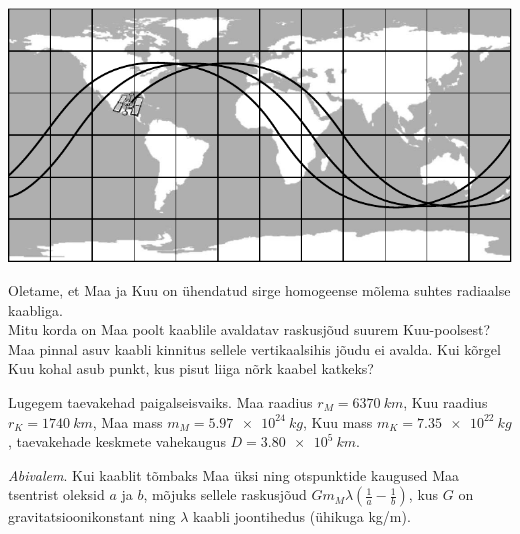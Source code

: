 \documentclass[10pt]{article}
\begin{document}
{\begin{center}
	\includegraphics[width=\linewidth]{2005-v3g-09-yl}
\end{center}
\probend
\bigskip


Oletame, et Maa ja Kuu on ühendatud sirge homogeense mõlema suhtes radiaalse kaabliga.\\
\osa Mitu korda on Maa poolt kaablile avaldatav ras\-kus\-jõud suurem
Kuu-pool\-sest?\\
\osa Maa pinnal asuv kaabli kinnitus sellele vertikaalsihis jõudu ei avalda.
Kui kõrgel Kuu kohal asub punkt, kus pisut liiga nõrk kaabel katkeks?

Lugegem taevakehad paigalseisvaiks.
Maa raadius $r_M=\SI{6370}{km}$, Kuu raadius $r_K=\SI{1740}{km}$,
Maa mass $m_M=\SI{5,97e24}{kg}$, Kuu mass $m_K=\SI{7,35e22}{kg}$, taevakehade keskmete vahekaugus $D=\SI{3,80e5}{km}$.

\emph{Abivalem}. Kui kaablit tõmbaks Maa üksi ning otspunktide kaugused Maa
tsentrist oleksid $a$ ja $b$, mõjuks sellele raskusjõud $G m_M \lambda
\left( \tfrac1a - \tfrac1b \right)$,
kus $G$ on gravitatsioonikonstant ning $\lambda$ kaabli joontihedus (ühikuga \si{kg/m}).
\probend
\newpage

\bigskip


}
\end{document}
